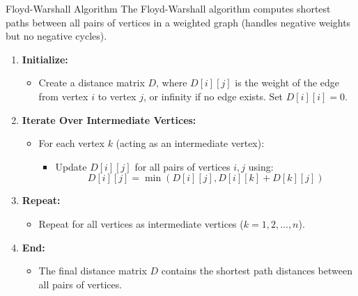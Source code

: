 \begin{usage}[]{Floyd-Warshall Algorithm}
    The Floyd-Warshall algorithm computes shortest paths between all pairs of vertices in a weighted graph (handles negative weights but no negative cycles).

    \begin{enumerate}
        \item \textbf{Initialize:}
              \begin{itemize}
                  \item Create a distance matrix \(D\), where \(D[i][j]\) is the weight of the edge from vertex \(i\) to vertex \(j\), or infinity if no edge exists. Set \(D[i][i] = 0\).
              \end{itemize}

        \item \textbf{Iterate Over Intermediate Vertices:}
              \begin{itemize}
                  \item For each vertex \(k\) (acting as an intermediate vertex):
                        \begin{itemize}
                            \item Update \(D[i][j]\) for all pairs of vertices \(i, j\) using:
                                  \[
                                      D[i][j] = \min(D[i][j], D[i][k] + D[k][j])
                                  \]
                        \end{itemize}
              \end{itemize}

        \item \textbf{Repeat:}
              \begin{itemize}
                  \item Repeat for all vertices as intermediate vertices (\(k = 1, 2, \ldots, n\)).
              \end{itemize}

        \item \textbf{End:}
              \begin{itemize}
                  \item The final distance matrix \(D\) contains the shortest path distances between all pairs of vertices.
              \end{itemize}
    \end{enumerate}
\end{usage}



